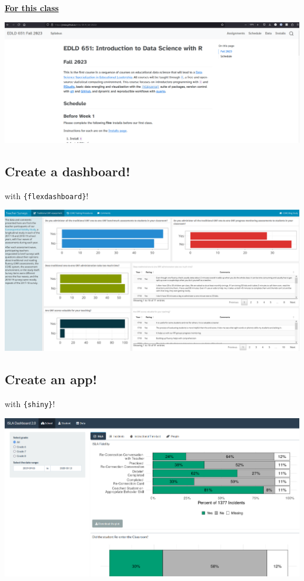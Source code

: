 \documentclass[
  letterpaper,
  DIV=11,
  numbers=noendperiod,
  oneside]{scrartcl}
\begin{document}
\href{https://uo-datasci-specialization.github.io/c1-intro-fall-2021/}{\textbf{For
this class}}

\includegraphics{images/edld651home.png}

\hypertarget{create-a-dashboard}{%
\subsection{Create a dashboard!}\label{create-a-dashboard}}

with \texttt{\{flexdashboard\}}!

\includegraphics[width=1\textwidth,height=\textheight]{images/dashboard-ex.png}

\hypertarget{create-an-app}{%
\subsection{Create an app!}\label{create-an-app}}

with \texttt{\{shiny\}}!

\includegraphics[width=1\textwidth,height=\textheight]{images/shiny-ex.png}
\end{document}
